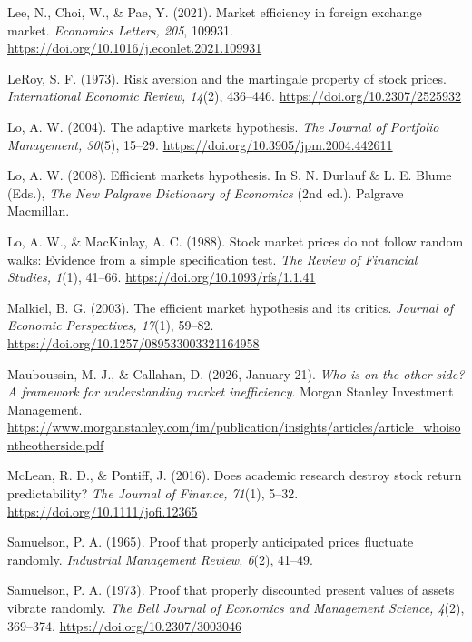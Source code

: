 \documentclass[11pt,a4paper]{article}
\begin{document}
\begin{fshfreferences}
\item Lee, N., Choi, W., \& Pae, Y. (2021). Market efficiency in foreign exchange market. \textit{Economics Letters, 205}, 109931. \url{https://doi.org/10.1016/j.econlet.2021.109931}

\item LeRoy, S. F. (1973). Risk aversion and the martingale property of stock prices. \textit{International Economic Review, 14}(2), 436--446. \url{https://doi.org/10.2307/2525932}

\item Lo, A. W. (2004). The adaptive markets hypothesis. \textit{The Journal of Portfolio Management, 30}(5), 15--29. \url{https://doi.org/10.3905/jpm.2004.442611}

\item Lo, A. W. (2008). Efficient markets hypothesis. In S. N. Durlauf \& L. E. Blume (Eds.), \textit{The New Palgrave Dictionary of Economics} (2nd ed.). Palgrave Macmillan.

\item Lo, A. W., \& MacKinlay, A. C. (1988). Stock market prices do not follow random walks: Evidence from a simple specification test. \textit{The Review of Financial Studies, 1}(1), 41--66. \url{https://doi.org/10.1093/rfs/1.1.41}

\item Malkiel, B. G. (2003). The efficient market hypothesis and its critics. \textit{Journal of Economic Perspectives, 17}(1), 59--82. \url{https://doi.org/10.1257/089533003321164958}

\item Mauboussin, M. J., \& Callahan, D. (2026, January 21). \textit{Who is on the other side? A framework for understanding market inefficiency}. Morgan Stanley Investment Management. \url{https://www.morganstanley.com/im/publication/insights/articles/article_whoisontheotherside.pdf}

\item McLean, R. D., \& Pontiff, J. (2016). Does academic research destroy stock return predictability? \textit{The Journal of Finance, 71}(1), 5--32. \url{https://doi.org/10.1111/jofi.12365}

\item Samuelson, P. A. (1965). Proof that properly anticipated prices fluctuate randomly. \textit{Industrial Management Review, 6}(2), 41--49.

\item Samuelson, P. A. (1973). Proof that properly discounted present values of assets vibrate randomly. \textit{The Bell Journal of Economics and Management Science, 4}(2), 369--374. \url{https://doi.org/10.2307/3003046}


\end{fshfreferences}
\end{document}
